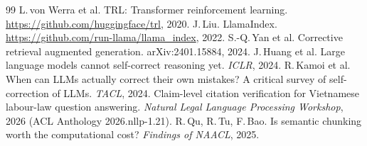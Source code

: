 \documentclass[11pt,a4paper]{article}
\begin{document}
\begin{thebibliography}{99}
 L.\,von Werra et al. TRL: Transformer reinforcement learning. \url{https://github.com/huggingface/trl}, 2020.
 J.\,Liu. LlamaIndex. \url{https://github.com/run-llama/llama_index}, 2022.
 S.-Q.\,Yan et al. Corrective retrieval augmented generation. arXiv:2401.15884, 2024.
 J.\,Huang et al. Large language models cannot self-correct reasoning yet. \textit{ICLR}, 2024.
 R.\,Kamoi et al. When can LLMs actually correct their own mistakes? A critical survey of self-correction of LLMs. \textit{TACL}, 2024.
 Claim-level citation verification for Vietnamese labour-law question answering. \textit{Natural Legal Language Processing Workshop}, 2026 (ACL Anthology 2026.nllp-1.21).
 R.\,Qu, R.\,Tu, F.\,Bao. Is semantic chunking worth the computational cost? \textit{Findings of NAACL}, 2025.
\end{thebibliography}
\end{document}
